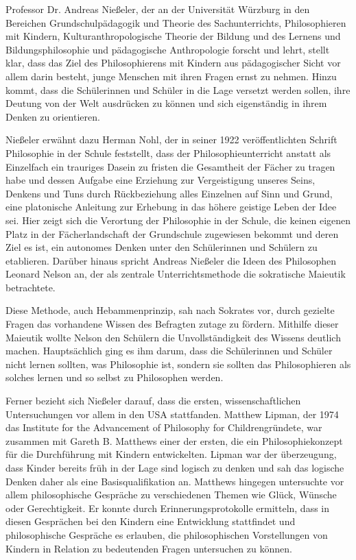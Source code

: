 Professor Dr. Andreas Nießeler, der an der Universität Würzburg in den Bereichen Grundschulpädagogik und Theorie des Sachunterrichts, Philosophieren mit Kindern, Kulturanthropologische Theorie der Bildung und des Lernens und Bildungsphilosophie und pädagogische Anthropologie forscht und lehrt, stellt klar, dass das Ziel des Philosophierens mit Kindern aus pädagogischer Sicht vor allem darin besteht, \glqq junge Menschen mit ihren Fragen ernst zu nehmen\grqq{}\cite[S.\,617]{AN13}.
Hinzu kommt, dass die Schülerinnen und Schüler in die Lage versetzt werden sollen, ihre Deutung von der Welt ausdrücken zu können und sich eigenständig in ihrem Denken zu orientieren. 

Nießeler erwähnt dazu Herman Nohl, der in seiner 1922 veröffentlichten Schrift \glqq Philosophie in der Schule\grqq{} feststellt, dass der Philosophieunterricht \glqq anstatt als Einzelfach ein trauriges Dasein zu fristen die Gesamtheit der Fächer zu tragen habe und dessen Aufgabe eine Erziehung zur \glqq Vergeistigung unseres Seins, Denkens und Tuns durch Rückbeziehung alles Einzelnen auf Sinn und Grund, eine platonische Anleitung zur Erhebung in das höhere geistige Leben der Idee\grqq{} sei.\grqq{}\cite[S.\,618]{AN13}
Hier zeigt sich die Verortung der Philosophie in der Schule, die keinen eigenen Platz in der Fächerlandschaft der Grundschule zugewiesen bekommt und deren Ziel es ist, ein autonomes Denken unter den Schülerinnen und Schülern zu etablieren. 
Darüber hinaus spricht Andreas Nießeler die Ideen des Philosophen Leonard Nelson an, der als zentrale Unterrichtsmethode die sokratische Maieutik betrachtete. 

Diese Methode, auch Hebammenprinzip, sah nach Sokrates vor, durch gezielte Fragen das vorhandene Wissen des Befragten zutage zu fördern. 
Mithilfe dieser Maieutik wollte Nelson den Schülern die Unvollständigkeit des Wissens deutlich machen. 
Hauptsächlich ging es ihm darum, dass die Schülerinnen und Schüler nicht lernen sollten, was Philosophie ist, sondern sie sollten das Philosophieren als solches lernen und so selbst zu Philosophen werden\cite[S.\,618]{AN13}. 

Ferner bezieht sich Nießeler darauf, dass die ersten, wissenschaftlichen Untersuchungen vor allem in den USA stattfanden. 
Matthew Lipman, der 1974 das \glqq Institute for the Advancement of Philosophy for Children\grqq gründete, war zusammen mit Gareth B. Matthews einer der ersten, die ein Philosophiekonzept für die Durchführung mit Kindern entwickelten. 
Lipman war der überzeugung, dass Kinder bereits früh in der Lage sind logisch zu denken und sah das logische Denken daher als eine Basisqualifikation an\cite[S.\,619]{AN13}. 
Matthews hingegen untersuchte vor allem philosophische Gespräche zu verschiedenen Themen wie \glqq Glück\grqq{}, \glqq Wünsche\grqq{} oder \glqq Gerechtigkeit\grqq{}. 
Er konnte durch Erinnerungsprotokolle ermitteln, dass in diesen Gesprächen bei den Kindern eine Entwicklung stattfindet und philosophische Gespräche es erlauben, die philosophischen Vorstellungen von Kindern in Relation zu bedeutenden Fragen untersuchen zu können.

